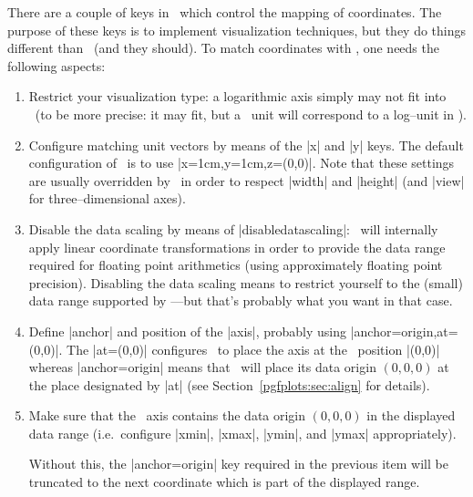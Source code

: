There are a couple of keys in \PGFPlots\ which control the mapping of coordinates. The purpose of these keys is to implement visualization techniques, but they do things different than \Tikz\ (and they should). To match coordinates with \Tikz, one needs the following aspects:
\begin{enumerate}
	\item Restrict your visualization type: a logarithmic axis simply may not fit into \Tikz\ (to be more precise: it may fit, but a \Tikz\ unit will correspond to a log--unit in \PGFPlots).

	\item Configure matching unit vectors by means of the |x| and |y| keys. The default configuration of \Tikz\ is to use |x=1cm,y=1cm,z={(0,0)}|. Note that these settings are usually overridden by \PGFPlots\ in order to respect |width| and |height| (and |view| for three--dimensional axes).
	\item Disable the data scaling by means of |disabledatascaling|: \PGFPlots\ will internally apply linear coordinate transformations in order to provide the data range required for floating point arithmetics (using approximately floating point precision). Disabling the data scaling means to restrict yourself to the (small) data range supported by \Tikz---but that's probably what you want in that case.
	\item Define |anchor| and position of the |axis|, probably using |anchor=origin,at={(0,0)}|. The |at={(0,0)}| configures \PGFPlots\ to place the axis at the \Tikz\ position |(0,0)| whereas |anchor=origin| means that \PGFPlots\ will place its data origin $(0,0,0)$ at the place designated by |at| (see Section~\ref{pgfplots:sec:align} for details).

	\item Make sure that the \PGFPlots\ axis contains the data origin $(0,0,0)$ in the displayed data range (i.e.\ configure |xmin|, |xmax|, |ymin|, and |ymax| appropriately).

	Without this, the |anchor=origin| key required in the previous item will be truncated to the next coordinate which is part of the displayed range.
\end{enumerate}

